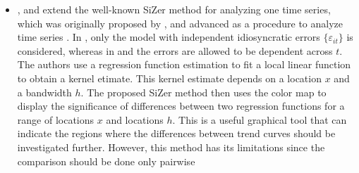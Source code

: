 \documentclass[a4paper,12pt]{article}
\begin{document}
\begin{itemize}[label=--,leftmargin=0.5cm]
\item \cite*{Park2008}, \cite*{ParkHannigKang2009} and \cite*{Park2009} extend the well-known SiZer method for analyzing one time series, which was originally proposed by \cite{ChaudhuriMarron1999}, and advanced as a procedure to analyze time series \cite{Rondonotti2007}. In \cite*{Park2008}, only the model with independent idiosyncratic errors $\{\varepsilon_{it}\}$ is considered, whereas in \cite*{ParkHannigKang2009} and \cite*{Park2009} the errors are allowed to be dependent across $t$. The authors use a regression function estimation to fit a local linear function to obtain a kernel etimate. This kernel estimate depends on a location $x$ and a bandwidth $h$. The proposed SiZer method then uses the color map to display the significance of differences between two regression functions for a range of locations $x$ and locations $h$. This is a useful graphical tool that can indicate the regions where the differences between trend curves should be investigated further. However, this method has its limitations since the comparison should be done only pairwise


\end{itemize}
\end{document}
